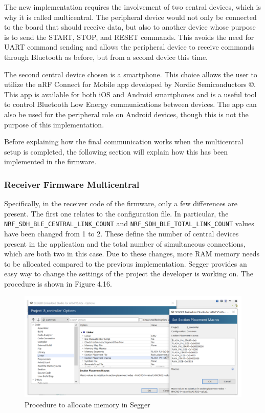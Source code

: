 \documentclass{Configuration_Files/PoliMi3i_thesis}
\begin{document}
The new implementation requires the involvement of two central devices, which is why it is called multicentral. The peripheral device would not only be connected to the board that should receive data, but also to another device whose purpose is to send the START, STOP, and RESET commands. This avoids the need for UART command sending and allows the peripheral device to receive commands through Bluetooth as before, but from a second device this time.

The second central device chosen is a smartphone. This choice allows the user to utilize the nRF Connect for Mobile app developed by Nordic Semiconductors ©. This app is available for both iOS and Android smartphones and is a useful tool to control Bluetooth Low Energy communications between devices. The app can also be used for the peripheral role on Android devices, though this is not the purpose of this implementation.

Before explaining how the final communication works when the multicentral setup is completed, the following section will explain how this has been implemented in the firmware.

\subsubsection{Receiver Firmware Multicentral}
Specifically, in the receiver code of the firmware, only a few differences are present. The first one relates to the configuration file. In particular, the \texttt{NRF\_SDH\_BLE\_CENTRAL\_LINK\_COUNT} and \texttt{NRF\_SDH\_BLE\_TOTAL\_LINK\_COUNT} values have been changed from 1 to 2. These define the number of central devices present in the application and the total number of simultaneous connections, which are both two in this case. Due to these changes, more RAM memory needs to be allocated compared to the previous implementation. Segger provides an easy way to change the settings of the project the developer is working on. The procedure is shown in Figure 4.16.

\begin{figure}[H]
    \centering
    \includegraphics[scale=0.5]{Multicentral/3.png}
    \caption{Procedure to allocate memory in Segger}
    \label{multicentral_3}
\end{figure}
\end{document}
